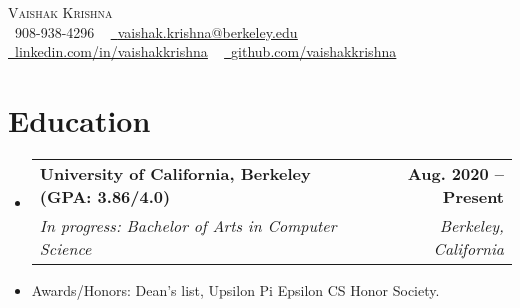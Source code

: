 \documentclass[letterpaper,11pt]{article}
\makeatletter
\newcommand{\resumeSubheading}[4]{
  \vspace{-2pt}\item
    \begin{tabular*}{1.0\textwidth}[t]{l@{\extracolsep{\fill}}r}
      \textbf{#1} & \textbf{\small #2} \\
      \textit{\small#3} & \textit{\small #4} \\
    \end{tabular*}\vspace{-7pt}
}
\newcommand{\resumeSubHeadingListStart}{\begin{itemize}[leftmargin=0.0in, label={}]}
\newcommand{\resumeSubHeadingListEnd}{\end{itemize}}
\makeatother
\begin{document}

\begin{center}
    {\Huge \scshape Vaishak Krishna} \\ \vspace{1pt}
    \small \raisebox{-0.1\height}\faPhone\ 908-938-4296 ~ \href{mailto:vaishak.krishna@berkeley.edu}{\raisebox{-0.2\height}\faEnvelope\  \underline{vaishak.krishna@berkeley.edu}} ~ 
    \href{https://linkedin.com/in/vaishakkrishna/}{\raisebox{-0.2\height}\faLinkedin\ \underline{linkedin.com/in/vaishakkrishna}}  ~
    \href{https://github.com/vaishakkrishna}{\raisebox{-0.2\height}\faGithub\ \underline{github.com/vaishakkrishna}}
    \vspace{-8pt}
\end{center}


\section{Education}
  \resumeSubHeadingListStart
    \resumeSubheading
  {University of California, Berkeley (GPA: 3.86/4.0)}{Aug. 2020 -- Present}
      {In progress: Bachelor of Arts in Computer Science}{Berkeley, California}
    \vspace{-5pt}
      \item{Awards/Honors: Dean's list, Upsilon Pi Epsilon CS Honor Society.}

  \resumeSubHeadingListEnd   
  
\vspace{-10pt}
\end{document}
